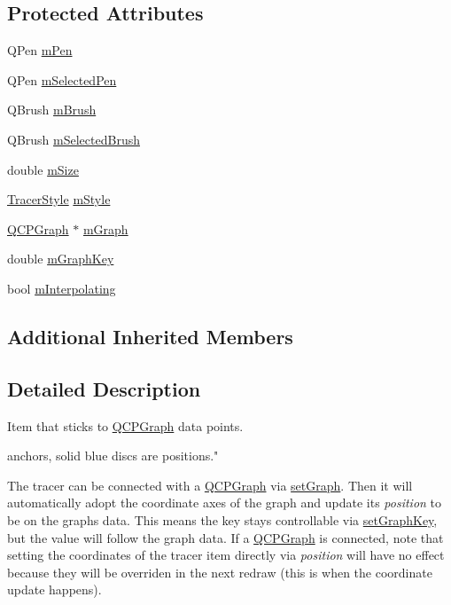 \subsection*{Protected Attributes}
\begin{DoxyCompactItemize}
\item 
Q\+Pen \hyperlink{class_q_c_p_item_tracer_a579e3bd6bd16d6aaff03638dc8a99a69}{m\+Pen}
\item 
Q\+Pen \hyperlink{class_q_c_p_item_tracer_a3f61829784200819661d1e2a5354d866}{m\+Selected\+Pen}
\item 
Q\+Brush \hyperlink{class_q_c_p_item_tracer_a6597be63a17a266233941354200b2340}{m\+Brush}
\item 
Q\+Brush \hyperlink{class_q_c_p_item_tracer_a1c15d2adde40efdcc0ef1ff78fd256a6}{m\+Selected\+Brush}
\item 
double \hyperlink{class_q_c_p_item_tracer_a575153a24bb357d1e006f6bc3bd099b9}{m\+Size}
\item 
\hyperlink{class_q_c_p_item_tracer_a2f05ddb13978036f902ca3ab47076500}{Tracer\+Style} \hyperlink{class_q_c_p_item_tracer_afb1f236bebf417544e0138fef22a292e}{m\+Style}
\item 
\hyperlink{class_q_c_p_graph}{Q\+C\+P\+Graph} $\ast$ \hyperlink{class_q_c_p_item_tracer_a2d70cf616b579563aa15f796dfc143ac}{m\+Graph}
\item 
double \hyperlink{class_q_c_p_item_tracer_a8fa20f2e9ee07d21fd7c8d30ba4702ca}{m\+Graph\+Key}
\item 
bool \hyperlink{class_q_c_p_item_tracer_afab37c22ad39f235921e86f93cd84595}{m\+Interpolating}
\end{DoxyCompactItemize}
\subsection*{Additional Inherited Members}


\subsection{Detailed Description}
Item that sticks to \hyperlink{class_q_c_p_graph}{Q\+C\+P\+Graph} data points. 

 anchors, solid blue discs are positions."

The tracer can be connected with a \hyperlink{class_q_c_p_graph}{Q\+C\+P\+Graph} via \hyperlink{class_q_c_p_item_tracer_af5886f4ded8dd68cb4f3388f390790c0}{set\+Graph}. Then it will automatically adopt the coordinate axes of the graph and update its {\itshape position} to be on the graph\textquotesingle{}s data. This means the key stays controllable via \hyperlink{class_q_c_p_item_tracer_a6840143b42f3b685cedf7c6d83a704c8}{set\+Graph\+Key}, but the value will follow the graph data. If a \hyperlink{class_q_c_p_graph}{Q\+C\+P\+Graph} is connected, note that setting the coordinates of the tracer item directly via {\itshape position} will have no effect because they will be overriden in the next redraw (this is when the coordinate update happens).

